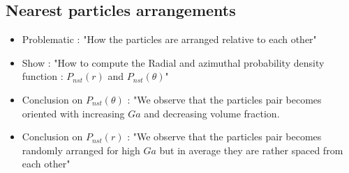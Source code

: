 






\subsection{Nearest particles arrangements}
\begin{itemize}
    \item Problematic : "How the particles are arranged relative to each other"
    \item Show : "How to compute the Radial and azimuthal probability density function : $P_{nst}(r)$  and $P_{nst}(\theta)$"
    \item  Conclusion on $P_{nst}(\theta)$ : "We observe that the particles pair becomes oriented with increasing $Ga$ and decreasing volume fraction.
    \item  Conclusion on $P_{nst}(r)$ : "We observe that the particles pair becomes randomly arranged for high $Ga$ but in average they are rather spaced from each other" 
\end{itemize}

